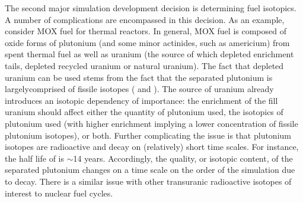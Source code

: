 The second major simulation development decision is determining fuel
isotopics. A number of complications are encompassed in this decision. As an
example, consider MOX fuel for thermal reactors. In general, MOX fuel is
composed of oxide forms of plutonium (and some minor actinides, such as
americium) from spent thermal fuel as well as uranium (the source of which
depleted enrichment tails, depleted recycled uranium or natural uranium). The
fact that depleted uranium can be used stems from the fact that the separated
plutonium is largelycomprised of fissile isotopes ( and
). The source of uranium already introduces an isotopic dependency
of importance: the  enrichment of the fill uranium should affect
either the quantity of plutonium used, the isotopics of plutonium used (with
higher  enrichment implying a lower concentration of fissile
plutonium isotopes), or both. Further complicating the issue is that plutonium
isotopes are radioactive and decay on (relatively) short time scales. For
instance, the half life of  is $\sim$14 years. Accordingly, the
quality, or isotopic content, of the separated plutonium changes on a time scale
on the order of the simulation due to decay. There is a similar issue with other
transuranic radioactive isotopes of interest to nuclear fuel cycles.

